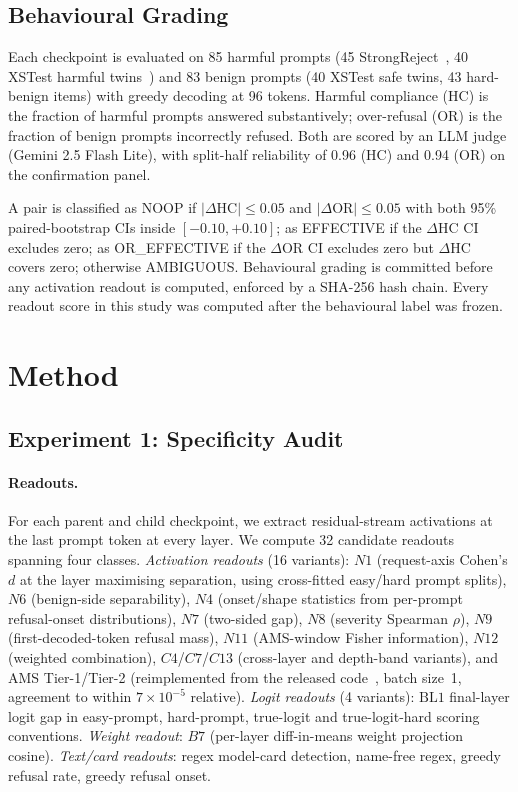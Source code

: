 \documentclass[11pt,letterpaper]{article}
\begin{document}
\subsection{Behavioural Grading}

Each checkpoint is evaluated on 85 harmful prompts (45 StrongReject~\citep{Mazeika2024}, 40 XSTest harmful twins~\citep{Rottger2023}) and 83 benign prompts (40 XSTest safe twins, 43 hard-benign items) with greedy decoding at 96 tokens. Harmful compliance (HC) is the fraction of harmful prompts answered substantively; over-refusal (OR) is the fraction of benign prompts incorrectly refused. Both are scored by an LLM judge (Gemini 2.5 Flash Lite), with split-half reliability of 0.96 (HC) and 0.94 (OR) on the confirmation panel.

A pair is classified as NOOP if $|\Delta\text{HC}| \leq 0.05$ and $|\Delta\text{OR}| \leq 0.05$ with both 95\% paired-bootstrap CIs inside $[-0.10, +0.10]$; as EFFECTIVE if the $\Delta$HC CI excludes zero; as OR\_EFFECTIVE if the $\Delta$OR CI excludes zero but $\Delta$HC covers zero; otherwise AMBIGUOUS. Behavioural grading is committed before any activation readout is computed, enforced by a SHA-256 hash chain. Every readout score in this study was computed after the behavioural label was frozen.


\section{Method}
\label{sec:method}

\subsection{Experiment 1: Specificity Audit}
\label{sec:exp1-method}

\paragraph{Readouts.}
For each parent and child checkpoint, we extract residual-stream activations at the last prompt token at every layer. We compute 32 candidate readouts spanning four classes. \emph{Activation readouts} (16 variants): $N1$ (request-axis Cohen's $d$ at the layer maximising separation, using cross-fitted easy/hard prompt splits), $N6$ (benign-side separability), $N4$ (onset/shape statistics from per-prompt refusal-onset distributions), $N7$ (two-sided gap), $N8$ (severity Spearman $\rho$), $N9$ (first-decoded-token refusal mass), $N11$ (AMS-window Fisher information), $N12$ (weighted combination), $C4$/$C7$/$C13$ (cross-layer and depth-band variants), and AMS Tier-1/Tier-2 (reimplemented from the released code~\citep{Messenger2026}, batch size~1, agreement to within $7 \times 10^{-5}$ relative). \emph{Logit readouts} (4 variants): $\text{BL1}$ final-layer logit gap in easy-prompt, hard-prompt, true-logit and true-logit-hard scoring conventions. \emph{Weight readout}: $B7$ (per-layer diff-in-means weight projection cosine). \emph{Text/card readouts}: regex model-card detection, name-free regex, greedy refusal rate, greedy refusal onset.
\end{document}
